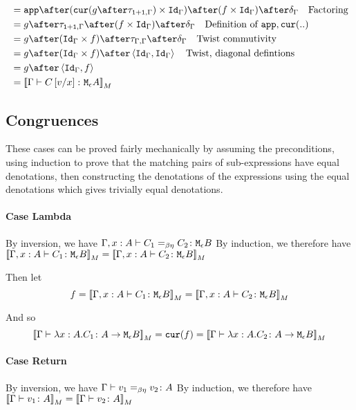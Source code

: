 {\begin{align}
            & = \app\after(\cur{g\after\twist{\1+\1}{\G}}\times \idg)\after (f\times \idg)\after\diag{\G}\qt{Factoring}\\
           & = g\after\twist{\1+\1}{\G} \after (f\times \idg)\after\diag{\G} \qt{Definition of $\app,\cur{..}$}\\
           & = g\after(\idg\times f)\after \twist{\G}{\G} \after\diag{\G} \qt{Twist commutivity}\\
           & = g\after(\idg\times f) \after\pr{\idg}{\idg} \qt{Twist, diagonal defintions} \\
           & = g\after\pr{\idg}{f} \\
           & = \deno{\gtyperelation{C\ssub{x}{v}}{\mea}} \\
        \end{align}






    \subsection{Congruences}
    These cases can be proved fairly mechanically by assuming the preconditions, using induction to prove that the matching pairs of sub-expressions have equal denotations, then constructing the denotations of the expressions using the equal denotations which gives trivially equal denotations.

    \paragraph{Case Lambda}
        By inversion, we have $\Gamma, x: A \vdash C_1 =_{\beta\eta} C_2 \colon \texttt{M}_{\epsilon}{B}$
        By induction, we therefore have ${\bf [\![}\Gamma, x: A \vdash C_1 \colon \texttt{M}_{\epsilon}{B}{\bf ]\!]}_M = {\bf [\![}\Gamma, x: A \vdash C_2 \colon \texttt{M}_{\epsilon}{B}{\bf ]\!]}_M$

        Then let
        \begin{equation}
            f = {\bf [\![}\Gamma, x: A \vdash C_1 \colon \texttt{M}_{\epsilon}{B}{\bf ]\!]}_M = {\bf [\![}\Gamma, x: A \vdash C_2 \colon \texttt{M}_{\epsilon}{B}{\bf ]\!]}_M
        \end{equation}

        And so
        \begin{equation}
            {\bf [\![}\Gamma \vdash \lambda x : A. C_1 \colon A \rightarrow \texttt{M}_{\epsilon}{B}{\bf ]\!]}_M = \texttt{cur}(f) = {\bf [\![}\Gamma \vdash \lambda x : A. C_2 \colon A \rightarrow \texttt{M}_{\epsilon}{B}{\bf ]\!]}_M
        \end{equation}


    \paragraph{Case Return}
    By inversion, we have $\Gamma \vdash v_1 =_{\beta\eta} v_2 \colon A$
    By induction, we therefore have ${\bf [\![}\Gamma \vdash v_1 \colon A{\bf ]\!]}_M = {\bf [\![}\Gamma \vdash v_2 \colon A{\bf ]\!]}_M$

}
